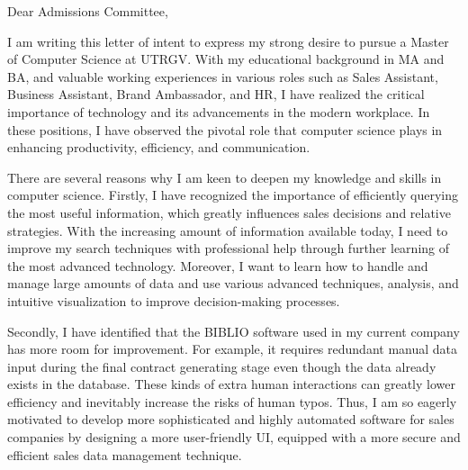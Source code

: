 \documentclass{letter}
\begin{document}
\begin{letter}{Dear Admissions Committee,}
\opening{}


I am writing this letter of intent to express my strong desire to pursue a Master of Computer Science at UTRGV. With my educational background in MA and BA, and valuable working experiences in various roles such as Sales Assistant, Business Assistant, Brand Ambassador, and HR, I have realized the critical importance of technology and its advancements in the modern workplace. In these positions, I have observed the pivotal role that computer science plays in enhancing productivity, efficiency, and communication.



There are several reasons why I am keen to deepen my knowledge and skills in computer science. Firstly, I have recognized the importance of efficiently querying the most useful information, which greatly influences sales decisions and relative strategies. With the increasing amount of information available today, I need to improve my search techniques with professional help through further learning of the most advanced technology. Moreover, I want to learn how to handle and manage large amounts of data and use various advanced techniques, analysis, and intuitive visualization to improve decision-making processes.





Secondly, I have identified that the BIBLIO software used in my current company has more room for improvement. For example, it requires redundant manual data input during the final contract generating stage even though the data already exists in the database. These kinds of extra human interactions can greatly lower efficiency and inevitably increase the risks of human typos. Thus, I am so eagerly motivated to develop more sophisticated and highly automated software for sales companies by designing a more user-friendly UI, equipped with a more secure and efficient sales data management technique.







\end{letter}
\end{document}
